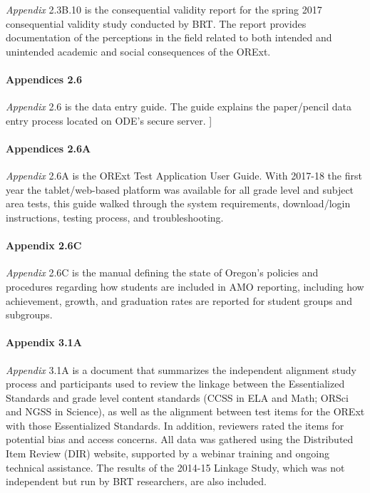 \documentclass[]{article}
\let\oldparagraph\paragraph
\renewcommand{\paragraph}[1]{\oldparagraph{#1}\mbox{}}
\begin{document}
\emph{Appendix} 2.3B.10 is the consequential validity report for the
spring 2017 consequential validity study conducted by BRT. The report
provides documentation of the perceptions in the field related to both
intended and unintended academic and social consequences of the ORExt.

\paragraph{Appendices 2.6}\label{appendices-2.6}

\emph{Appendix} 2.6 is the data entry guide. The guide explains the
paper/pencil data entry process located on ODE's secure server. {]}

\paragraph{Appendices 2.6A}\label{appendices-2.6a}

\emph{Appendix} 2.6A is the ORExt Test Application User Guide. With
2017-18 the first year the tablet/web-based platform was available for
all grade level and subject area tests, this guide walked through the
system requirements, download/login instructions, testing process, and
troubleshooting.

\paragraph{Appendix 2.6C}\label{appendix-2.6c}

\emph{Appendix} 2.6C is the manual defining the state of Oregon's
policies and procedures regarding how students are included in AMO
reporting, including how achievement, growth, and graduation rates are
reported for student groups and subgroups.

\paragraph{Appendix 3.1A}\label{appendix-3.1a}

\emph{Appendix} 3.1A is a document that summarizes the independent
alignment study process and participants used to review the linkage
between the Essentialized Standards and grade level content standards
(CCSS in ELA and Math; ORSci and NGSS in Science), as well as the
alignment between test items for the ORExt with those Essentialized
Standards. In addition, reviewers rated the items for potential bias and
access concerns. All data was gathered using the Distributed Item Review
(DIR) website, supported by a webinar training and ongoing technical
assistance. The results of the 2014-15 Linkage Study, which was not
independent but run by BRT researchers, are also included.
\end{document}
